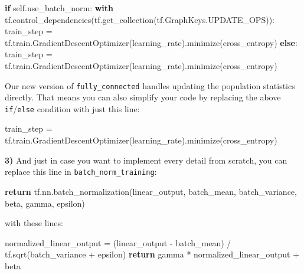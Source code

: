 \documentclass[11pt]{article}
\newenvironment{Shaded}{}{}
\newcommand{\NormalTok}[1]{{#1}}
\newcommand{\VariableTok}[1]{\textcolor[rgb]{0.10,0.09,0.49}{{#1}}}
\newcommand{\ControlFlowTok}[1]{\textcolor[rgb]{0.00,0.44,0.13}{\textbf{{#1}}}}
\newcommand{\OperatorTok}[1]{\textcolor[rgb]{0.40,0.40,0.40}{{#1}}}
\begin{document}
\begin{Shaded}
\begin{Highlighting}[]
\ControlFlowTok{if} \VariableTok{self}\NormalTok{.use_batch_norm:}
    \ControlFlowTok{with}\NormalTok{ tf.control_dependencies(tf.get_collection(tf.GraphKeys.UPDATE_OPS)):}
\NormalTok{        train_step }\OperatorTok{=}\NormalTok{ tf.train.GradientDescentOptimizer(learning_rate).minimize(cross_entropy)}
\ControlFlowTok{else}\NormalTok{:}
\NormalTok{    train_step }\OperatorTok{=}\NormalTok{ tf.train.GradientDescentOptimizer(learning_rate).minimize(cross_entropy)}
\end{Highlighting}
\end{Shaded}

Our new version of \texttt{fully\_connected} handles updating the
population statistics directly. That means you can also simplify your
code by replacing the above \texttt{if}/\texttt{else} condition with
just this line:

\begin{Shaded}
\begin{Highlighting}[]
\NormalTok{train_step }\OperatorTok{=}\NormalTok{ tf.train.GradientDescentOptimizer(learning_rate).minimize(cross_entropy)}
\end{Highlighting}
\end{Shaded}

    \textbf{3)} And just in case you want to implement every detail from
scratch, you can replace this line in \texttt{batch\_norm\_training}:

\begin{Shaded}
\begin{Highlighting}[]
\ControlFlowTok{return}\NormalTok{ tf.nn.batch_normalization(linear_output, batch_mean, batch_variance, beta, gamma, epsilon)}
\end{Highlighting}
\end{Shaded}

with these lines:

\begin{Shaded}
\begin{Highlighting}[]
\NormalTok{normalized_linear_output }\OperatorTok{=}\NormalTok{ (linear_output }\OperatorTok{-}\NormalTok{ batch_mean) }\OperatorTok{/}\NormalTok{ tf.sqrt(batch_variance }\OperatorTok{+}\NormalTok{ epsilon)}
\ControlFlowTok{return}\NormalTok{ gamma }\OperatorTok{*}\NormalTok{ normalized_linear_output }\OperatorTok{+}\NormalTok{ beta}
\end{Highlighting}
\end{Shaded}
\end{document}
